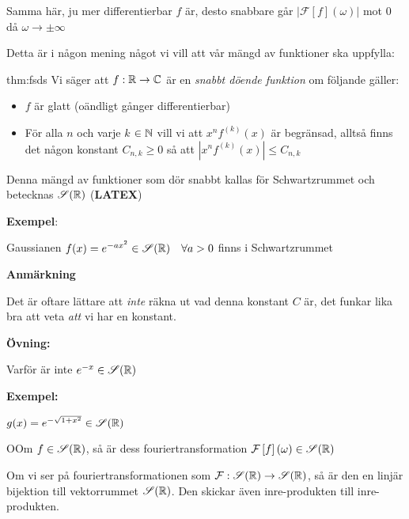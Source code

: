 \noindent Samma här, ju mer differentierbar $f$ är, desto snabbare går $\left|\mathcal{F}\left[f\right](\omega)\right|$ mot 0 då $\omega\to\pm\infty$
\par\bigskip
\noindent Detta är i någon mening något vi vill att vår mängd av funktioner ska uppfylla:
\par\bigskip
\begin{theo}{thm:fsds}
  Vi säger att $f:\mathbb{R}\to\mathbb{C}$ är en \textit{snabbt döende funktion} om följande gäller:\par
  \begin{itemize}
    \item $f$ är glatt (oändligt gånger differentierbar)
      \par\bigskip
    \item För alla $n$ och varje $k$ $\in\mathbb{N}$ vill vi att $x^nf^{(k)}(x)$ är begränsad, alltså finns det någon konstant $C_{n,k}\geq0$ så att $\left|x^nf^{(k)}(x)\right|\leq C_{n,k}$
  \end{itemize}
\end{theo}
\par\bigskip
\noindent Denna mängd av funktioner som dör snabbt kallas för Schwartzrummet och betecknas $\mathscr{S}(\mathbb{R})$ (\textbf{LATEX})
\par\bigskip
\noindent\textbf{Exempel}:\par
\noindent Gaussianen $f(x) = e^{-ax^2}\in\mathscr{S}(\mathbb{R})\quad\forall a>0$ finns i Schwartzrummet  
\par\bigskip
\noindent\textbf{Anmärkning}\par
\noindent Det är oftare lättare att \textit{inte} räkna ut vad denna konstant $C$ är, det funkar lika bra att veta \textit{att} vi har en konstant.
\par\bigskip
\noindent\textbf{Övning:}\par
\noindent Varför är inte $e^{-x}\in\mathscr{S}(\mathbb{R})$ 
\par\bigskip
\noindent\textbf{Exempel:}\par
\noindent $g(x) = e^{-\sqrt{1+x^2}}\in\mathscr{S}(\mathbb{R})$
\par\bigskip
\begin{theo}
  OOm $f\in\mathscr{S}(\mathbb{R})$, så är dess fouriertransformation $\mathcal{F}\left[f\right](\omega)\in\mathscr{S}(\mathbb{R})$
  \par\bigskip
  \noindent Om vi ser på fouriertransformationen som $\mathcal{F}:\mathscr{S}(\mathbb{R})\to\mathscr{S}(\mathbb{R})$, så är den en linjär bijektion till vektorrummet $\mathscr{S}(\mathbb{R})$. Den skickar även inre-produkten till inre-produkten. \par
\end{theo}
